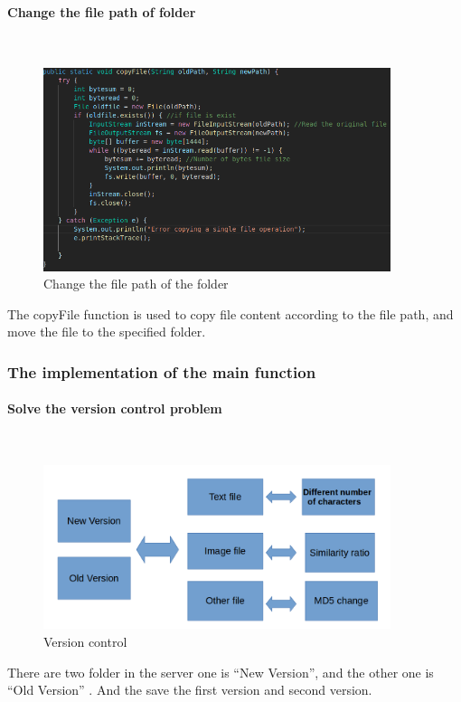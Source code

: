 \documentclass[12pt,a4]{article}
\begin{document}
\paragraph{Change the file path of folder}~{}
\newline
\begin{figure}[h]%
		\centering  %
		\includegraphics[width=4in]{figure/4241}  	%
		\caption{Change the file path of the folder}   %
		\end{figure}
The copyFile function is used to copy file content according to the file path, and move the file to the specified folder.
\subsubsection{The implementation of the main function
}\label{4.2.1}
\paragraph{Solve the version control problem}~{}
\newline
\begin{figure}[h]%
		\centering  %
		\includegraphics[width=4in]{figure/ffirst}  	%
		\caption{Version control}   %
		\end{figure}
There are two folder in the server one is “New Version”, and the other one is “Old Version” . And the save the first version and second version. 
\\\\
\end{document}
